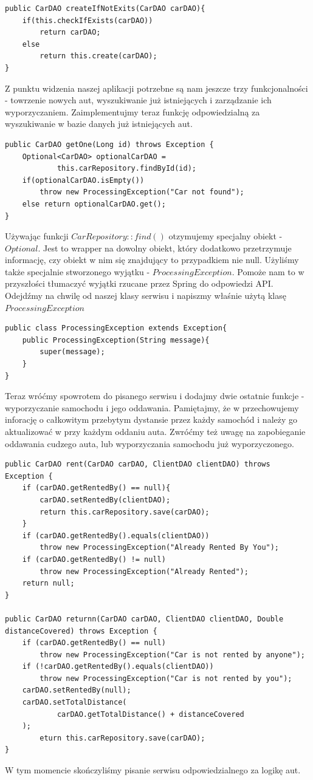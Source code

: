 \documentclass{article}
\begin{document}
        \begin{verbatim}
public CarDAO createIfNotExits(CarDAO carDAO){
    if(this.checkIfExists(carDAO))
        return carDAO;
    else
        return this.create(carDAO);
}
        \end{verbatim}
        Z punktu widzenia naszej aplikacji potrzebne są nam jeszcze trzy funkcjonalności - towrzenie nowych aut, wyszukiwanie już istniejących i zarządzanie ich wyporzyczaniem. Zaimplementujmy teraz funkcję odpowiedzialną za wyszukiwanie w bazie danych już istniejących aut.
        \begin{verbatim}
public CarDAO getOne(Long id) throws Exception {
    Optional<CarDAO> optionalCarDAO =
            this.carRepository.findById(id);
    if(optionalCarDAO.isEmpty())
        throw new ProcessingException("Car not found");
    else return optionalCarDAO.get();
}
        \end{verbatim}
        Używając funkcji $CarRepository::find()$ otzymujemy specjalny obiekt - $Optional$. Jest to wrapper na dowolny obiekt, który dodatkowo przetrzymuje informację, czy obiekt w nim się znajdujący to przypadkiem nie null. Użyliśmy także specjalnie stworzonego wyjątku - $ProcessingException$. Pomoże nam to w przyszłości tłumaczyć wyjątki rzucane przez Spring do odpowiedzi API. Odejdźmy na chwilę od naszej klasy serwisu i napiszmy właśnie użytą klasę $ProcessingException$
        \begin{verbatim}
public class ProcessingException extends Exception{
    public ProcessingException(String message){
        super(message);
    }
}
        \end{verbatim}
        Teraz wróćmy spowrotem do pisanego serwisu i dodajmy dwie ostatnie funkcje - wyporzyczanie samochodu i jego oddawania. Pamiętajmy, że w przechowujemy inforację o całkowitym przebytym dystansie przez każdy samochód i należy go aktualizować w przy każdym oddaniu auta. Zwróćmy też uwagę na zapobieganie oddawania cudzego auta, lub wyporzyczania samochodu już wyporzyczonego.
        \begin{verbatim}
public CarDAO rent(CarDAO carDAO, ClientDAO clientDAO) throws Exception {
    if (carDAO.getRentedBy() == null){
        carDAO.setRentedBy(clientDAO);
        return this.carRepository.save(carDAO);
    }
    if (carDAO.getRentedBy().equals(clientDAO))
        throw new ProcessingException("Already Rented By You");
    if (carDAO.getRentedBy() != null)
        throw new ProcessingException("Already Rented");
    return null;
}

public CarDAO returnn(CarDAO carDAO, ClientDAO clientDAO, Double distanceCovered) throws Exception {
    if (carDAO.getRentedBy() == null)
        throw new ProcessingException("Car is not rented by anyone");
    if (!carDAO.getRentedBy().equals(clientDAO))
        throw new ProcessingException("Car is not rented by you");
    carDAO.setRentedBy(null);
    carDAO.setTotalDistance(
            carDAO.getTotalDistance() + distanceCovered
    );
        eturn this.carRepository.save(carDAO);
}
        \end{verbatim}
        W tym momencie skończyliśmy pisanie serwisu odpowiedzialnego za logikę aut.
\end{document}
